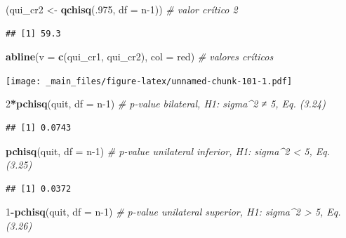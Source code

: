 \documentclass[
]{book}
\newenvironment{Shaded}{\begin{snugshade}}{\end{snugshade}}
\newcommand{\CommentTok}[1]{\textcolor[rgb]{0.56,0.35,0.01}{\textit{#1}}}
\newcommand{\DataTypeTok}[1]{\textcolor[rgb]{0.13,0.29,0.53}{#1}}
\newcommand{\DecValTok}[1]{\textcolor[rgb]{0.00,0.00,0.81}{#1}}
\newcommand{\KeywordTok}[1]{\textcolor[rgb]{0.13,0.29,0.53}{\textbf{#1}}}
\newcommand{\NormalTok}[1]{#1}
\newcommand{\OperatorTok}[1]{\textcolor[rgb]{0.81,0.36,0.00}{\textbf{#1}}}
\newcommand{\StringTok}[1]{\textcolor[rgb]{0.31,0.60,0.02}{#1}}
\theoremstyle{definition}
\theoremstyle{definition}
\theoremstyle{definition}
\theoremstyle{remark}
\begin{document}
\begin{Shaded}
\begin{Highlighting}[]
\NormalTok{(qui\_cr2 \textless{}{-}}\StringTok{ }\KeywordTok{qchisq}\NormalTok{(.}\DecValTok{975}\NormalTok{, }\DataTypeTok{df =}\NormalTok{ n}\DecValTok{{-}1}\NormalTok{)) }\CommentTok{\# valor crítico 2}
\end{Highlighting}
\end{Shaded}

\begin{verbatim}
## [1] 59.3
\end{verbatim}

\begin{Shaded}
\begin{Highlighting}[]
\KeywordTok{abline}\NormalTok{(}\DataTypeTok{v =} \KeywordTok{c}\NormalTok{(qui\_cr1, qui\_cr2), }\DataTypeTok{col =} \StringTok{\textquotesingle{}red\textquotesingle{}}\NormalTok{) }\CommentTok{\# valores críticos}
\end{Highlighting}
\end{Shaded}

\texttt{[image: \_main\_files/figure-latex/unnamed-chunk-101-1.pdf]}

\begin{Shaded}
\begin{Highlighting}[]
\DecValTok{2}\OperatorTok{*}\KeywordTok{pchisq}\NormalTok{(quit, }\DataTypeTok{df =}\NormalTok{ n}\DecValTok{{-}1}\NormalTok{) }\CommentTok{\# p{-}value bilateral, H1: sigma\^{}2 ≠ 5, Eq. (3.24)}
\end{Highlighting}
\end{Shaded}

\begin{verbatim}
## [1] 0.0743
\end{verbatim}

\begin{Shaded}
\begin{Highlighting}[]
\KeywordTok{pchisq}\NormalTok{(quit, }\DataTypeTok{df =}\NormalTok{ n}\DecValTok{{-}1}\NormalTok{) }\CommentTok{\# p{-}value unilateral inferior, H1: sigma\^{}2 \textless{} 5, Eq. (3.25)}
\end{Highlighting}
\end{Shaded}

\begin{verbatim}
## [1] 0.0372
\end{verbatim}

\begin{Shaded}
\begin{Highlighting}[]
\DecValTok{1}\OperatorTok{{-}}\KeywordTok{pchisq}\NormalTok{(quit, }\DataTypeTok{df =}\NormalTok{ n}\DecValTok{{-}1}\NormalTok{) }\CommentTok{\# p{-}value unilateral superior, H1: sigma\^{}2 \textgreater{} 5, Eq. (3.26)}
\end{Highlighting}
\end{Shaded}
\end{document}

